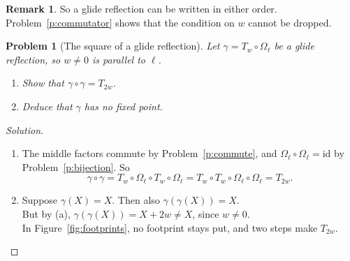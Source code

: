 \documentclass[11pt,a4paper]{article}
\theoremstyle{boxed}
\newtheorem{problem}{Problem}
\theoremstyle{definition}
\newtheorem*{remark}{Remark}
\newenvironment{solution}{\begin{proof}[Solution]}{\end{proof}}
\newenvironment{plate}{\par\medskip\noindent\begin{minipage}{\linewidth}\centering}{\end{minipage}\par\medskip}
\newcommand{\id}{\mathrm{id}}
\begin{document}
\begin{remark}
So a glide reflection can be written in either order.\\
Problem~\ref{p:commutator} shows that the condition on $w$ cannot be dropped.
\end{remark}

\begin{plate}
\label{fig:commute}
\end{plate}

\begin{problem}[The square of a glide reflection]\label{p:glide-square}
Let $\gamma=T_w\circ\Omega_\ell$ be a glide reflection, so $w\neq0$ is parallel to $\ell$.
\begin{enumerate}
    \item Show that $\gamma\circ\gamma=T_{2w}$.
    \item Deduce that $\gamma$ has no fixed point.
\end{enumerate}
\end{problem}

\begin{solution}
\leavevmode
\begin{enumerate}
    \item The middle factors commute by Problem~\ref{p:commute}, and $\Omega_\ell\circ\Omega_\ell=\id$ by Problem~\ref{p:bijection}. So
    \[
    \gamma\circ\gamma=T_w\circ\Omega_\ell\circ T_w\circ\Omega_\ell=T_w\circ T_w\circ\Omega_\ell\circ\Omega_\ell=T_{2w}.
    \]
    \item Suppose $\gamma(X)=X$. Then also $\gamma(\gamma(X))=X$.\\
    But by (a), $\gamma(\gamma(X))=X+2w\neq X$, since $w\neq0$.\\
    In Figure~\ref{fig:footprints}, no footprint stays put, and two steps make $T_{2w}$. \qedhere
\end{enumerate}
\end{solution}
\end{document}
